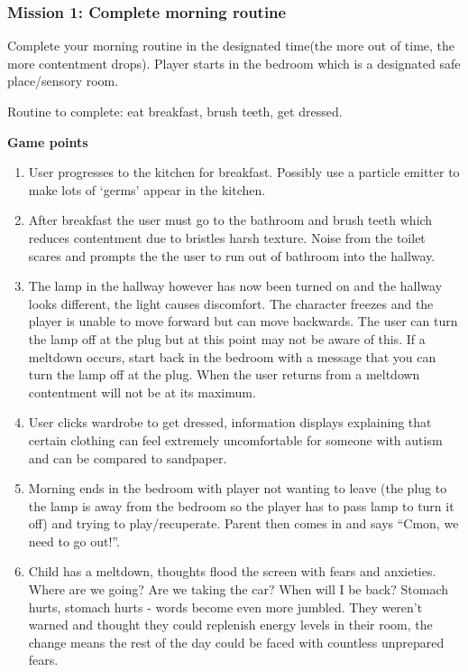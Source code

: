 \documentclass[11pt]{report}
\begin{document}
\subsubsection*{Mission 1: Complete morning routine}
Complete your morning routine in the designated time(the more out of time, the more contentment drops). Player starts in the bedroom which is a designated safe place/sensory room. 

Routine to complete: eat breakfast, brush teeth, get dressed.

\textbf{Game points}
\begin{enumerate}
\item User progresses to the kitchen for breakfast. Possibly use a particle emitter to make lots of ‘germs’ appear in the kitchen.
\item After breakfast the user must go to the bathroom and brush teeth which reduces contentment due to bristles harsh texture. Noise from the toilet scares and prompts the the user to run out of bathroom into the hallway.
\item The lamp in the hallway however has now been turned on and the hallway looks different, the light causes discomfort. The character freezes and the player is unable to move forward but can move backwards. The user can turn the lamp off at the plug but at this point may not be aware of this. If a meltdown occurs, start back in the bedroom with a message that you can turn the lamp off at the plug. When the user returns from a meltdown contentment will not be at its maximum.
\item User clicks wardrobe to get dressed, information displays explaining that certain clothing can feel extremely uncomfortable for someone with autism and can be compared to sandpaper.
\item Morning ends in the bedroom with player not wanting to leave (the plug to the lamp is away from the bedroom so the player has to pass lamp to turn it off) and trying to play/recuperate. Parent then comes in and says “Cmon, we need to go out!”.
\item Child has a meltdown, thoughts flood the screen with fears and anxieties. Where are we going? Are we taking the car? When will I be back? Stomach hurts, stomach hurts - words become even more jumbled. They weren't warned and thought they could replenish energy levels in their room, the change means the rest of the day could be faced with countless unprepared fears.
\end{enumerate}
\end{document}
